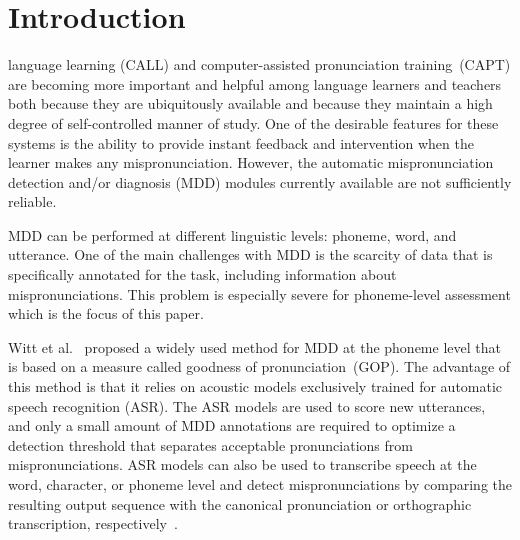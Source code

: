 \section{Introduction}
 language learning (CALL) and computer-assisted pronunciation training~(CAPT) are becoming more important and helpful among language learners and teachers both because they are ubiquitously available and because they maintain a high degree of self-controlled manner of study. 
One of the desirable features for these systems is the ability to provide instant feedback and intervention when the learner makes any mispronunciation.
However, the automatic mispronunciation detection and/or diagnosis (MDD) modules currently available are not sufficiently reliable.

MDD can be performed at different linguistic levels: phoneme, word, and utterance.
One of the main challenges with MDD is the scarcity of data that is specifically annotated for the task, including information about mispronunciations.
This problem is especially severe for phoneme-level assessment which is the focus of this paper.

Witt et al.~\cite{witt2000phone} proposed a widely used method for MDD at the phoneme level that is based on a measure called goodness of pronunciation~(GOP).
The advantage of this method is that it relies on acoustic models exclusively trained for automatic speech recognition (ASR).
The ASR models are used to score new utterances, and only a small amount of MDD annotations are required to optimize a detection threshold that separates acceptable pronunciations from mispronunciations.
ASR models can also be used to transcribe speech at the word, character, or phoneme level and detect mispronunciations by comparing the resulting output sequence with the canonical pronunciation or orthographic transcription, respectively~\cite{cnn-rnn-ctc, fu2021textdependent, textdep2, hybrid, getman2022wav2vec2}.

